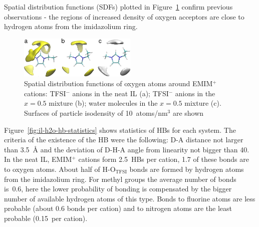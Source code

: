 Spatial distribution functions (SDFs) plotted in Figure~\ref{fig:il-h2o-sdf} confirm previous observations - the regions of increased density of oxygen acceptors are close to hydrogen atoms from the imidazolium ring.

\begin{figure}
    \centering
    \includegraphics[width=0.5\textwidth]{img/3-structural-data-from-md-simulations/6-il-h2o/sdf.png}
    \caption{Spatial distribution functions of oxygen atoms around EMIM$^{+}$ cations: TFSI$^{-}$ anions in the neat IL (a); TFSI$^{-}$ anions in the $x = 0.5$ mixture (b); water molecules in the $x = 0.5$ mixture (c). Surfaces of particle isodensity of 10~atoms/nm$^{3}$ are shown}
    \label{fig:il-h2o-sdf}
\end{figure}

Figure~\ref{fig:il-h2o-hb-statistics} shows statistics of HBs for each system. The criteria of the existence of the HB were the following: D-A distance not larger than 3.5~{\AA} and the deviation of D-H-A angle from linearity not bigger than 40{\degree}. In the neat IL, EMIM$^{+}$ cations form 2.5~HBs per cation, 1.7 of these bonds are to oxygen atoms. About half of H-O$_{\text{TFSI}}$ bonds are formed by hydrogen atoms from the imidazolium ring. For methyl groups the average number of bonds is~0.6, here the lower probability of bonding is compensated by the bigger number of available hydrogen atoms of this type. Bonds to fluorine atoms are less probable (about 0.6 bonds per cation) and to nitrogen atoms are the least probable (0.15~per cation).

